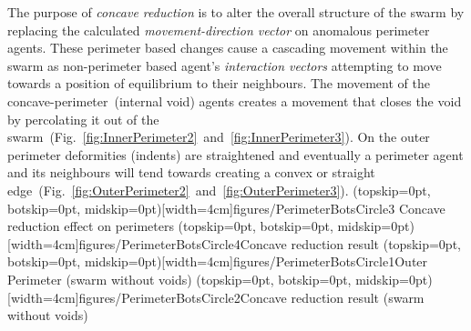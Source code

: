 \documentclass{ieeeaccess}
\begin{document}
The purpose of \textit{concave reduction} is to alter the overall structure of the swarm by replacing the calculated \textit{movement-direction vector} on anomalous perimeter agents. These perimeter based changes cause a cascading movement within the swarm as non-perimeter based agent's \textit{interaction vectors} attempting to move towards a position of equilibrium to their neighbours. The movement of the concave-perimeter~(internal void) agents creates a movement that closes the void by percolating it out of the swarm~(Fig.~\ref{fig:InnerPerimeter2}~and~\ref{fig:InnerPerimeter3}). On the outer perimeter deformities (indents) are straightened and eventually a perimeter agent and its neighbours will tend towards creating a convex or straight edge~(Fig.~\ref{fig:OuterPerimeter2}~and~\ref{fig:OuterPerimeter3}).
\Figure[t!](topskip=0pt, botskip=0pt, midskip=0pt)[width=4cm]{figures/PerimeterBotsCircle3}
{Concave reduction effect on perimeters\label{fig:InnerPerimeter2}}
\Figure[t!](topskip=0pt, botskip=0pt, midskip=0pt)[width=4cm]{figures/PerimeterBotsCircle4}{Concave reduction result\label{fig:InnerPerimeter3}}
\Figure[t!](topskip=0pt, botskip=0pt, midskip=0pt)[width=4cm]{figures/PerimeterBotsCircle1}{Outer Perimeter (swarm without voids)\label{fig:OuterPerimeter2}}
\Figure[t!](topskip=0pt, botskip=0pt, midskip=0pt)[width=4cm]{figures/PerimeterBotsCircle2}{Concave reduction result (swarm without voids)\label{fig:OuterPerimeter3}}
\end{document}
